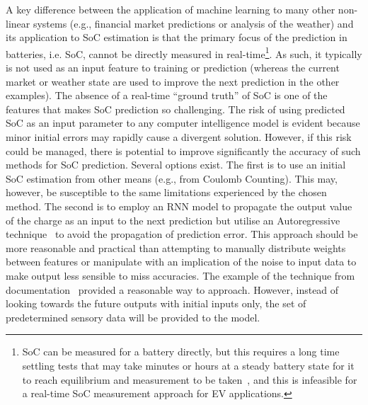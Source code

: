 %
%
A key difference between the application of machine learning to many other non-linear systems (e.g., financial market predictions or analysis of the weather) and its application to SoC estimation is that the primary focus of the prediction in batteries, i.e. SoC, cannot be directly measured in real-time\footnote{SoC can be measured for a battery directly, but this requires a long time settling tests that may take minutes or hours at a steady battery state for it to reach equilibrium and measurement to be taken~\cite{ali_towards_2019}, and this is infeasible for a real-time SoC measurement approach for EV applications.}.
As such, it typically is not used as an input feature to training or prediction (whereas the current market or weather state are used to improve the next prediction in the other examples).
The absence of a real-time “ground truth” of SoC is one of the features that makes SoC prediction so challenging. %
The risk of using predicted SoC as an input parameter to any computer intelligence model is evident because minor initial errors may rapidly cause a divergent solution.
However, if this risk could be managed, there is potential to improve significantly the accuracy of such methods for SoC prediction.
Several options exist.
The first is to use an initial SoC estimation from other means (e.g., from Coulomb Counting).
This may, however, be susceptible to the same limitations experienced by the chosen method.
The second is to employ an RNN model to propagate the output value of the charge as an input to the next prediction but utilise an Autoregressive technique~\cite{time_2020} to avoid the propagation of prediction error.
This approach should be more reasonable and practical than attempting to manually distribute weights between features or manipulate with an implication of the noise to input data to make output less sensible to miss accuracies.
The example of the technique from documentation~\cite{time_2020} provided a reasonable way to approach.
However, instead of looking towards the future outputs with initial inputs only, the set of predetermined sensory data will be provided to the model.

